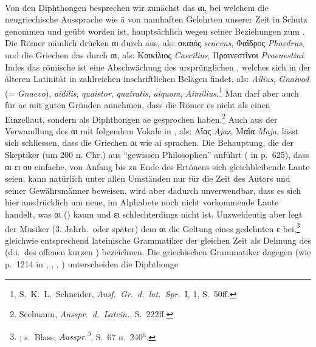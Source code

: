 \paragraph{\label{par:diphthongen}} Von den Diphthongen besprechen wir zunächst
das αι, bei welchem die
neugriechische Aussprache wie ä von namhaften Gelehrten unserer Zeit in Schutz
genommen und geübt worden ist, hauptsächlich wegen seiner Beziehungen zum
 .
Die Römer nämlich drücken αι durch  aus, als: σκαιός \emph{scaevus}, Φαῖδρος
\emph{Phaedrus}, und die Griechen das   durch αι, als: Καικίλιος
\emph{Caecilius}, Πραινεστῖνοι \emph{Praenestini}.
Indes das römische  ist eine Abschwächung des
ursprünglichen , welches sich in der älteren Latinität in zahlreichen
inschriftlichen Belägen findet, als: \emph{Ailius}, \emph{Gnaivod} (=
\emph{Gnaevo}), \emph{aidilis},
\emph{quaistor}, \emph{quairatis}, \emph{aiquom}, \emph{Aimilius}.\footnote{%
	S.~K.~L.~Schneider, \emph{Ausf.\ Gr.\ d.\ lat.\ Spr.}\ I, 1, S.\ 50ff.}
Man darf aber auch für ae mit guten Gründen annehmen, dass die Römer es nicht
als einen Einzellaut, sondern als Diphthongen ae gesprochen haben.\footnote{%
	Seelmann, \emph{Ausspr.\ d.\ Latein.}, S.\ 222ff.}
Auch aus der  Verwandlung des
 αι mit folgendem Vokale in , als: Αἴας
\emph{Ajax}, Μαῖα \emph{Maja}, lässt sich
schliessen, dass die Griechen αι wie ai sprachen. Die Behauptung, die der
Skeptiker  (um 200 n. Chr.) aus “gewissen Philosophen” anführt
( in  p.\ 625), dass αι ει ου einfache, von Anfang bis zu Ende des
Ertönens sich gleichbleibende Laute seien, kann natürlich unter allen Umständen
nur für die Zeit des Autors und seiner Gewährsmänner beweisen, wird aber
dadurch unverwendbar, dass es sich hier ausdrücklich um neue, im Alphabete noch
nicht vorkommende Laute handelt, was αι  () kaum und ει  schlechterdings nicht
ist.
Unzweideutig aber legt der Musiker  (3.
Jahrh.\ oder später) dem αι die Geltung eines gedehnten ε
bei,\footnote{; s.\ Blass, \emph{Ausspr.\textsuperscript{3}}, S.\ 67
	n.\ 240\textsuperscript{a}.}  gleichwie entsprechend
lateinische Grammatiker der gleichen Zeit  als Dehnung des  (d.i.\ des offenen
kurzen ) bezeichnen.
Die griechischen Grammatiker dagegen (wie  p.\
1214 in , ,
, ) unterscheiden die Diphthonge
